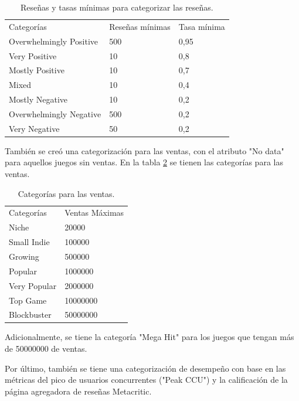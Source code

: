 \documentclass[conference]{IEEEtran}
\begin{document}
\begin{table}[]
\begin{tabular}{lll}
Categorías              & Reseñas mínimas & Tasa mínima \\
Overwhelmingly Positive & 500             & 0,95        \\
Very Positive           & 10              & 0,8         \\
Mostly Positive         & 10              & 0,7         \\
Mixed                   & 10              & 0,4         \\
Mostly Negative         & 10              & 0,2         \\
Overwhelmingly Negative & 500             & 0,2         \\
Very Negative           & 50              & 0,2        
\end{tabular}
\caption{Reseñas y tasas mínimas para categorizar las reseñas.}
\label{table_1}
\end{table}

También se creó una categorización para las ventas, con el atributo "No data" para aquellos juegos sin ventas. En la tabla \ref{table_2} se tienen las categorías para las ventas.

\begin{table}[]
\begin{tabular}{ll}
Categorías        & Ventas Máximas   \\
Niche             & 20000            \\
Small Indie       & 100000           \\
Growing           & 500000           \\
Popular           & 1000000          \\
Very Popular      & 2000000          \\
Top Game          & 10000000         \\
Blockbuster       & 50000000        
\end{tabular}
\caption{Categorías para las ventas.}
\label{table_2}
\end{table}

Adicionalmente, se tiene la categoría "Mega Hit" para los juegos que tengan más de 50000000 de ventas.

Por último, también se tiene una categorización de desempeño con base en las métricas del pico de usuarios concurrentes ("Peak CCU") y la calificación de la página agregadora de reseñas Metacritic.
\end{document}
